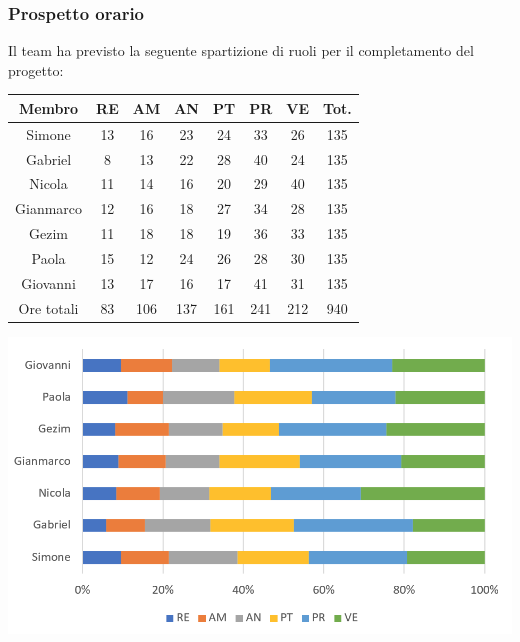 \subsubsection{Prospetto orario}
Il team ha previsto la seguente spartizione di ruoli per il completamento del progetto:
\\
\begin{center}
\begin{tabular}{ |c|c|c|c|c|c|c|c|  }
 \hline
 Membro 		& RE 		& AM 		& AN 	& PT 	& PR 	& VE 	& Tot.\\
 \hline\hline
 Simone			& 13 		& 16			& 23 		& 24 		& 33 		& 26 		& 135\\
 Gabriel		& 8 			& 13 		& 22 		& 28		& 40 		& 24 		& 135\\
 Nicola			& 11 		& 14 		& 16 		& 20 		& 29 		& 40 		& 135\\
 Gianmarco		& 12 		& 16 		& 18 		& 27	 	& 34 		& 28 		& 135\\
 Gezim			& 11 		& 18 		& 18 		& 19 		& 36 		& 33	 	& 135\\
 Paola			& 15 		& 12 		& 24 		& 26 		& 28 		& 30 		& 135\\
 Giovanni		& 13 		& 17	 		& 16 		& 17 		& 41	 	& 31  		& 135\\
 \hline\hline
 Ore totali		& 83 	& 106		& 137 	& 161 	& 241 	& 212 	& 940\\
  \hline
\end{tabular}
\end{center}
\includegraphics[width=\textwidth]{res/img/hip}
\\

